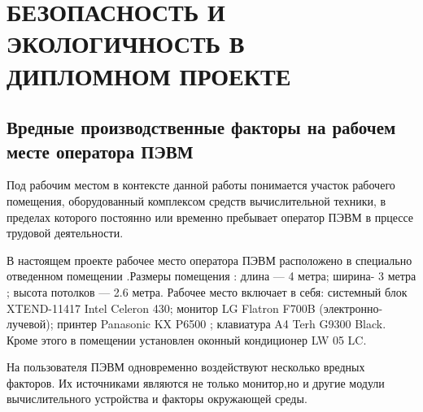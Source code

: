 \section{БЕЗОПАСНОСТЬ И ЭКОЛОГИЧНОСТЬ В ДИПЛОМНОМ ПРОЕКТЕ}

\subsection{Вредные производственные факторы на рабочем месте оператора ПЭВМ}
Под рабочим местом в контексте данной работы понимается участок рабочего
помещения, оборудованный комплексом средств вычислительной техники, в
пределах которого постоянно или временно пребывает оператор ПЭВМ в прцессе трудовой деятельности.


В настоящем проекте рабочее место оператора ПЭВМ расположено в 
специально отведенном помещении .Размеры помещения : длина — 4 метра;
ширина- 3 метра ; высота потолков — 2.6 метра. Рабочее место включает в себя:
системный блок XTEND-11417 Intel Celeron 430;  монитор LG Flatron F700B
(электронно-лучевой);  принтер  Panasonic KX P6500 ; клавиатура A4 Terh 
G9300 Black. Кроме этого в помещении установлен оконный кондиционер
LW 05 LC.

На пользователя ПЭВМ одновременно воздействуют несколько вредных факторов.
Их источниками являются не только монитор,но и другие модули вычислительного устройства
и факторы окружающей среды. 


